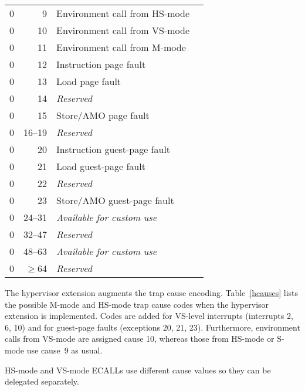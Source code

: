 \begin{table*}[p]
\begin{center}
\begin{tabular}{|r|r|l|l|}
  0         & 9               & Environment call from HS-mode \\
  0         & 10              & Environment call from VS-mode \\
  0         & 11              & Environment call from M-mode \\
  0         & 12              & Instruction page fault \\
  0         & 13              & Load page fault \\
  0         & 14              & {\em Reserved} \\
  0         & 15              & Store/AMO page fault \\
  0         & 16--19          & {\em Reserved} \\
  0         & 20              & Instruction guest-page fault \\
  0         & 21              & Load guest-page fault \\
  0         & 22              & {\em Reserved} \\
  0         & 23              & Store/AMO guest-page fault \\
  0         & 24--31          & {\em Available for custom use} \\
  0         & 32--47          & {\em Reserved} \\
  0         & 48--63          & {\em Available for custom use} \\
  0         & $\ge$64         & {\em Reserved} \\
  \hline
\end{tabular}
\end{center}
\caption{Machine and supervisor cause register ({\tt mcause} and
{\tt scause}) values when the hypervisor extension is implemented.}
\label{hcauses}
\end{table*}

The hypervisor extension augments the trap cause encoding.
Table~\ref{hcauses} lists the possible M-mode and HS-mode trap cause
codes when the hypervisor extension is implemented.
Codes are added for VS-level interrupts (interrupts 2, 6, 10) and for
guest-page faults (exceptions 20, 21, 23).
Furthermore, environment calls from VS-mode are assigned cause 10,
whereas those from HS-mode or S-mode use cause~9 as usual.

\begin{commentary}
HS-mode and VS-mode ECALLs use different cause values so they can be delegated
separately.
\end{commentary}

